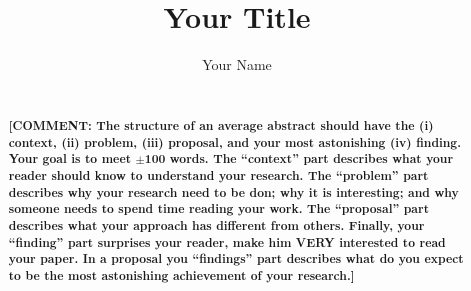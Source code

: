 \documentclass{libs/sig-alternate} %
\newcommand\comment[1]{{\sffamily\textbf{[COMMENT: #1]}}}
\begin{document}
\title{Your Title}

\author{
	\alignauthor
	Your Name\\
    \\
}


\maketitle

\begin{abstract}

\comment{The structure of an average abstract should have the (i) context, (ii) problem, (iii) proposal, and your most astonishing (iv) finding. Your goal is to meet $\pm$100 words. The ``context'' part describes what your reader should know to understand your research. The ``problem'' part describes why your research need to be don; why it is interesting; and why someone needs to spend time reading your work. The ``proposal'' part describes what your approach has different from others. Finally, your ``finding'' part surprises your reader, make him VERY interested to read your paper. In a proposal you ``findings'' part describes what do you expect to be the most astonishing achievement of your research.}

\end{abstract}




%


\newpage





\end{document}
